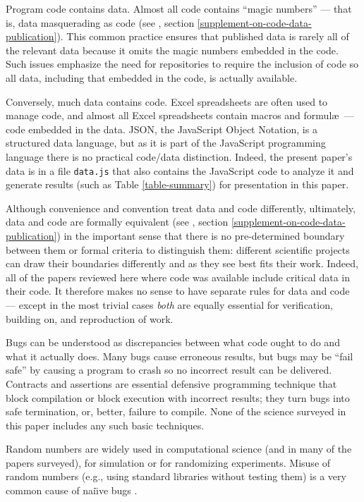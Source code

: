 \documentclass{comjnl}
\begin{document}
Program code contains data. Almost all code contains ``magic numbers'' --- that is, data masquerading as code (see \supplement, section \ref{supplement-on-code-data-publication}). This common practice ensures that published data is rarely all of the relevant data because it omits the magic numbers embedded in the code. Such issues emphasize the need for repositories to require the inclusion of code so all data, including that embedded in the code, is actually available. 

Conversely, much data contains code. Excel spreadsheets are often used to manage code, and almost all Excel spreadsheets contain macros and formul\ae\ --- code embedded in the data. JSON, the JavaScript Object Notation, is a structured data language, but as it is part of the JavaScript programming language there is no practical code/data distinction. Indeed, the present paper's data is in a file \texttt{data.js} that also contains the JavaScript code to analyze it and generate results (such as Table \ref{table-summary}) for presentation in this paper.

Although convenience and convention treat data and code differently, ultimately, data and code are formally equivalent (see \supplement, section \ref{supplement-on-code-data-publication}) in the important sense that there is no pre-determined boundary between them or formal criteria to distinguish them: different scientific projects can draw their boundaries differently and as they see best fits their work. Indeed, all of the papers reviewed here where code was available include critical data in their code. It therefore makes no sense to have separate rules for data and code --- except in the most trivial cases \emph{both\/} are equally essential for verification, building on, and reproduction of work. 

Bugs can be understood as discrepancies between what code ought to do and what it actually does. Many bugs cause erroneous results, but bugs may be ``fail safe'' by causing a program to crash so no incorrect result can be delivered. Contracts and assertions are essential defensive programming technique that block compilation or block execution with incorrect results; they turn bugs into safe termination, or, better, failure to compile. None of the science surveyed in this paper includes any such basic techniques. 

Random numbers are widely used in computational science (and in many of the papers surveyed), for simulation or for randomizing experiments. Misuse of random numbers (e.g., using standard libraries without testing them) is a very common cause of nai\"\i ve bugs \cite{knuth}.
\end{document}
